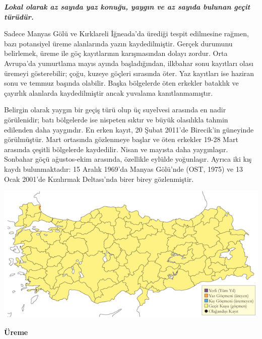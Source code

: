 \documentclass[
  a4paper,
  DIV=11,
  numbers=noendperiod]{scrreprt}
\begin{document}
\textbf{\emph{Lokal olarak az sayıda yaz konuğu, yaygın ve az sayıda
bulunan geçit türüdür.}}

Sadece Manyas Gölü ve Kırklareli İğneada'da ürediği tespit edilmesine
rağmen, bazı potansiyel üreme alanlarında yazın kaydedilmiştir. Gerçek
durumunu belirlemek, üreme ile göç kayıtlarının karışmasından dolayı
zordur. Orta Avrupa'da yumurtlama mayıs ayında başladığından, ilkbahar
sonu kayıtları olası üremeyi gösterebilir; çoğu, kuzeye göçleri
sırasında öter. Yaz kayıtları ise haziran sonu ve temmuz başında
olabilir. Başka bölgelerde öten erkekler bataklık ve çayırlık alanlarda
kaydedilmiştir ancak yuvalama kanıtlanmamıştır.

Belirgin olarak yaygın bir geçiş türü olup üç suyelvesi arasında en
nadir görülenidir; batı bölgelerde ise nispeten sıktır ve büyük
olasılıkla tahmin edilenden daha yaygındır. En erken kayıt, 20 Şubat
2011'de Birecik'in güneyinde görülmüştür. Mart ortasında gözlenmeye
başlar ve öten erkekler 19-28 Mart arasında çeşitli bölgelerde
kaydedilir. Nisan ve mayısta daha yaygınlaşır. Sonbahar göçü
ağustos-ekim arasında, özellikle eylülde yoğunlaşır. Ayrıca iki kış
kaydı bulunmaktadır: 15 Aralık 1969'da Manyas Gölü'nde (OST, 1975) ve 13
Ocak 2001'de Kızılırmak Deltası'nda birer birey gözlenmiştir.

\includegraphics{images/harita_Page_118.png}

\textbf{Üreme}
\end{document}
